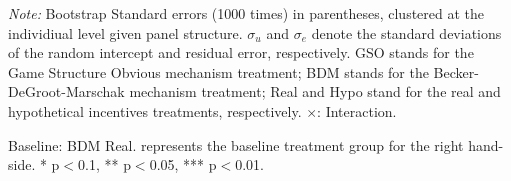 \documentclass[12pt]{article}
\begin{document}
\begin{table}[H]
\begin{tablenotes}
            \footnotesize
            \item \textit{Note:} Bootstrap Standard errors (1000 times) in parentheses, clustered at the individiual level given panel structure.  $\sigma_u$ and $\sigma_e$ denote the standard deviations of the random intercept and residual error, respectively. GSO stands for the Game Structure Obvious mechanism treatment; BDM stands for the Becker-DeGroot-Marschak mechanism treatment; Real and Hypo stand for the real and hypothetical incentives treatments, respectively. $\times$: Interaction.
           \item Baseline: BDM Real. represents the baseline treatment group for the right hand-side. * p$<$0.1, ** p$<$0.05, *** p$<$0.01.
        \end{tablenotes}
\end{table}



\clearpage
\end{document}
